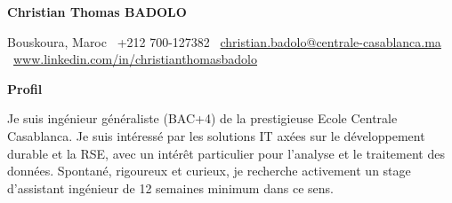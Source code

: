 \documentclass[11pt]{article}
\newcommand{\sectiontitle}[1]{\noindent\textbf{\large #1}}
\newcommand{\name}[1]{\textcolor{blue!80!black}{\textbf{\large #1}}}
\newcommand{\email}[1]{\href{mailto:{#1}}{#1}}
\newcommand{\website}[1]{\href{#1}{#1}}
\begin{document}
\begin{center}
    \name{Christian Thomas BADOLO}
    \hrulefill
\end{center}

\begin{center}
    Bouskoura, Maroc \textbullet \ +212 700-127382 \textbullet \ \email{christian.badolo@centrale-casablanca.ma} \textbullet \ \website{www.linkedin.com/in/christianthomasbadolo}
\end{center}

\vspace{0.5pt}

\sectiontitle{Profil}

Je suis ingénieur généraliste (BAC+4) de la prestigieuse Ecole Centrale Casablanca. Je suis intéressé par les solutions IT axées sur le développement durable et la RSE, avec un intérêt particulier pour l'analyse et le traitement des données. Spontané, rigoureux et curieux, je recherche activement un stage d'assistant ingénieur de 12 semaines minimum dans ce sens.
\end{document}
